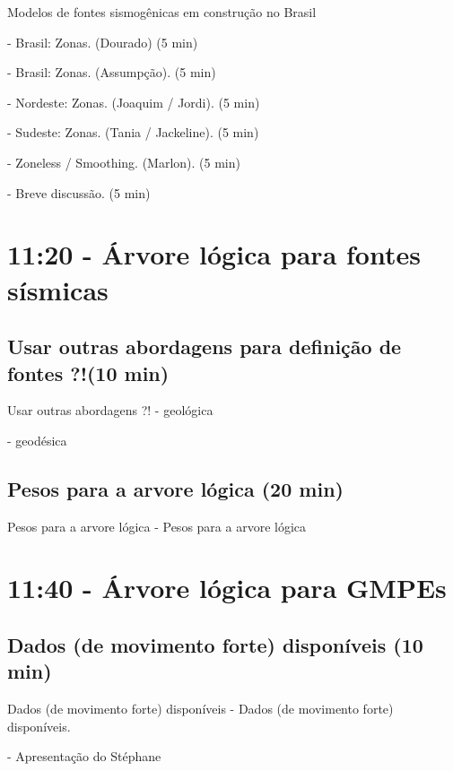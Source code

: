 \documentclass[ucs,8pt]{beamer}
\begin{document}
	\begin{frame}{Modelos de fontes sismogênicas em construção no Brasil}
		
		- Brasil: Zonas. (Dourado) (5 min)
	
		- Brasil: Zonas. (Assumpção). (5 min)
		
		- Nordeste: Zonas. (Joaquim / Jordi). (5 min)
		
		- Sudeste: Zonas. (Tania / Jackeline). (5 min)
		
		- Zoneless / Smoothing. (Marlon). (5 min)
		
		- Breve discussão. (5 min)
	
	\end{frame}



\section{11:20 - Árvore lógica para fontes sísmicas}
	\subsection{Usar outras abordagens para definição de fontes ?!(10 min)}
	\begin{frame}{Usar outras abordagens ?!}
		- geológica
		
		- geodésica
	\end{frame}

	\subsection{Pesos para a arvore lógica (20 min)}
	\begin{frame}{Pesos para a arvore lógica}
		- Pesos para a arvore lógica
	\end{frame}


\section{11:40 - Árvore lógica para GMPEs}


	\subsection{Dados (de movimento forte) disponíveis (10 min)}
	\begin{frame}{Dados (de movimento forte) disponíveis}
		- Dados (de movimento forte) disponíveis.
		
		- Apresentação do Stéphane
	\end{frame}
\end{document}
